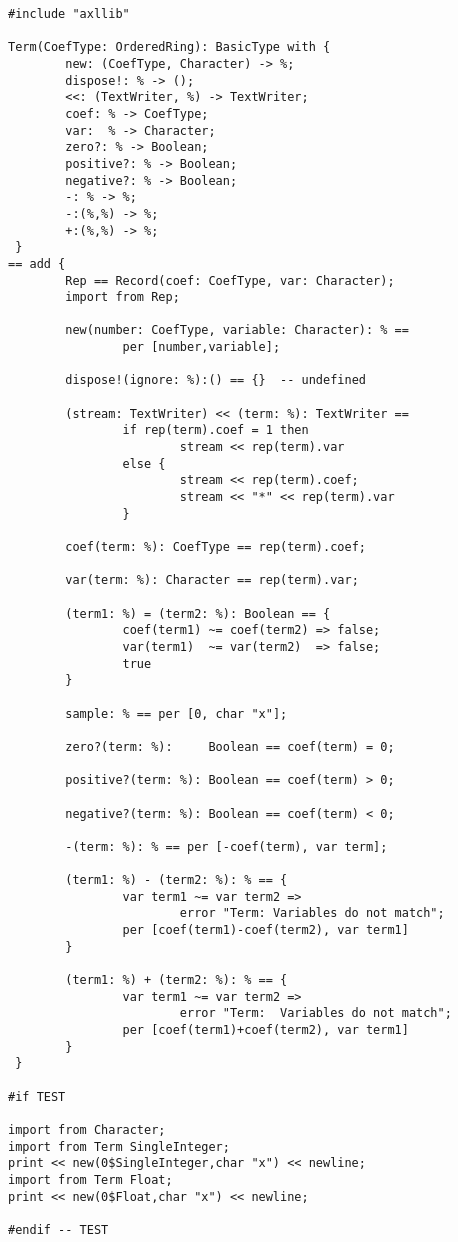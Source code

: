 \begin{small}
\begin{verbatim}
#include "axllib"

Term(CoefType: OrderedRing): BasicType with {          
        new: (CoefType, Character) -> %;                    
        dispose!: % -> ();
        <<: (TextWriter, %) -> TextWriter;
        coef: % -> CoefType;                                     
        var:  % -> Character;
        zero?: % -> Boolean;
        positive?: % -> Boolean;
        negative?: % -> Boolean;
        -: % -> %;
        -:(%,%) -> %;
        +:(%,%) -> %;
 }
== add { 
        Rep == Record(coef: CoefType, var: Character);       
        import from Rep;

        new(number: CoefType, variable: Character): % == 
                per [number,variable];

        dispose!(ignore: %):() == {}  -- undefined

        (stream: TextWriter) << (term: %): TextWriter == 
                if rep(term).coef = 1 then
                        stream << rep(term).var
                else {
                        stream << rep(term).coef;
                        stream << "*" << rep(term).var
                }

        coef(term: %): CoefType == rep(term).coef;

        var(term: %): Character == rep(term).var;

        (term1: %) = (term2: %): Boolean == {
                coef(term1) ~= coef(term2) => false;
                var(term1)  ~= var(term2)  => false;
                true
        }

        sample: % == per [0, char "x"];

        zero?(term: %):     Boolean == coef(term) = 0;

        positive?(term: %): Boolean == coef(term) > 0;

        negative?(term: %): Boolean == coef(term) < 0;

        -(term: %): % == per [-coef(term), var term];

        (term1: %) - (term2: %): % == {
                var term1 ~= var term2 => 
                        error "Term: Variables do not match";
                per [coef(term1)-coef(term2), var term1]
        }

        (term1: %) + (term2: %): % == {
                var term1 ~= var term2 => 
                        error "Term:  Variables do not match";
                per [coef(term1)+coef(term2), var term1]
        }
 }

#if TEST

import from Character;
import from Term SingleInteger;
print << new(0$SingleInteger,char "x") << newline;
import from Term Float;
print << new(0$Float,char "x") << newline;

#endif -- TEST

\end{verbatim}
\end{small}

